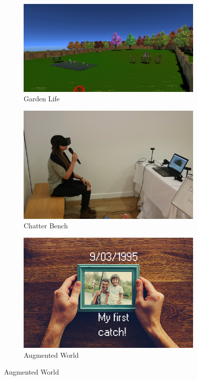 \begin{figure}[htbp]
\begin{subfigure}[t]{0.3\textwidth}
    \includegraphics[width=\linewidth]{Images/DemVR/GardenLife.png}
\caption{Garden Life}
\label{fig:gardenLife}
\end{subfigure}\hfill
\begin{subfigure}[t]{0.3\textwidth}
  \includegraphics[width=\linewidth]{Images/DemVR/ChatterBench.png}
\caption{Chatter Bench}
\label{fig:ChatterBench}
\end{subfigure}\hfill
\begin{subfigure}[t]{0.3\textwidth}
    \includegraphics[width=\linewidth]{Images/DemVR/AugmentedWorld.png}
\caption{Augmented World}
\label{fig:AugmentedWorld}
\end{subfigure}


\end{figure}
